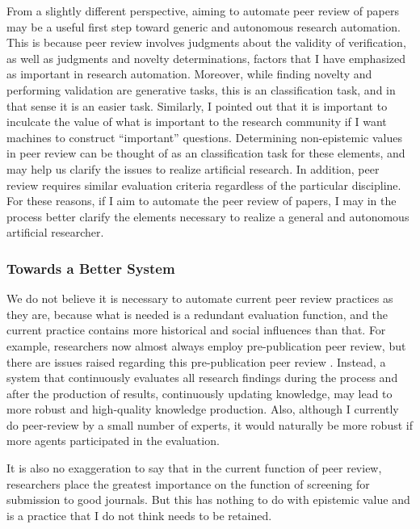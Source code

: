 \documentclass{article}
\begin{document}
From a slightly different perspective, aiming to automate peer review of papers may be a useful first step toward generic and autonomous research automation. This is because peer review involves judgments about the validity of verification, as well as judgments and novelty determinations, factors that I have emphasized as important in research automation. Moreover, while finding novelty and performing validation are generative tasks, this is an classification task, and in that sense it is an easier task. Similarly, I pointed out that it is important to inculcate the value of what is important to the research community if I want machines to construct ``important'' questions. Determining non-epistemic values in peer review can be thought of as an classification task for these elements, and may help us clarify the issues to realize artificial research. In addition, peer review requires similar evaluation criteria regardless of the particular discipline. For these reasons, if I aim to automate the peer review of papers, I may in the process better clarify the elements necessary to realize a general and autonomous artificial researcher.

\subsubsection{Towards a Better System}
We do not believe it is necessary to automate current peer review practices as they are, because what is needed is a redundant evaluation function, and the current practice contains more historical and social influences than that. For example, researchers now almost always employ pre-publication peer review, but there are issues raised regarding this pre-publication peer review \cite{heesen2021peer}. Instead, a system that continuously evaluates all research findings during the process and after the production of results, continuously updating knowledge, may lead to more robust and high-quality knowledge production. Also, although I currently do peer-review by a small number of experts, it would naturally be more robust if more agents participated in the evaluation.

It is also no exaggeration to say that in the current function of peer review, researchers place the greatest importance on the function of screening for submission to good journals. But this has nothing to do with epistemic value and is a practice that I do not think needs to be retained.
\end{document}
